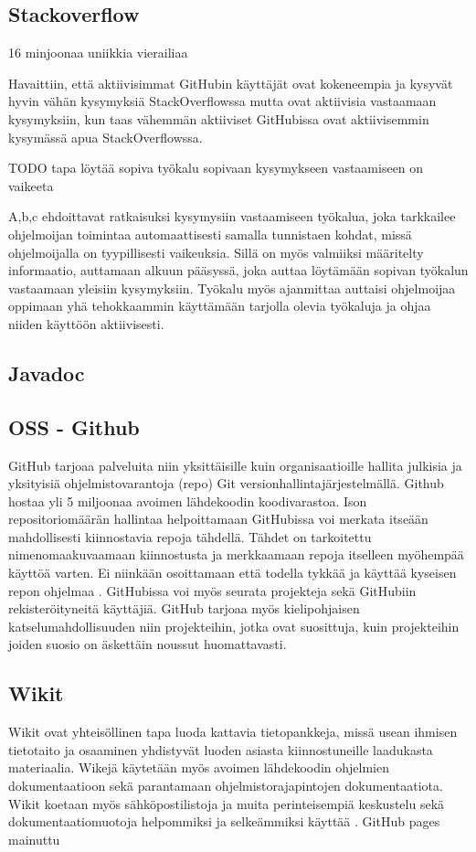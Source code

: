 \documentclass[finnish]{../tktltiki2}
\theoremstyle{definition}
\theoremstyle{remark}
\begin{document}
\subsection{Stackoverflow}
16 minjoonaa uniikkia vierailiaa \cite{social-networking-meets-se}
\cite{social-networking-meets-se}

Havaittiin, että aktiivisimmat GitHubin käyttäjät ovat kokeneempia ja kysyvät hyvin vähän kysymyksiä StackOverflowssa mutta ovat aktiivisia vastaamaan kysymyksiin, kun taas vähemmän aktiiviset GitHubissa ovat aktiivisemmin kysymässä apua StackOverflowssa.  \cite{stackoverflow-and-github}

TODO tapa löytää sopiva työkalu sopivaan kysymykseen vastaamiseen on vaikeeta \cite{programmers-coach}

A,b,c ehdoittavat ratkaisuksi kysymysiin vastaamiseen työkalua, joka tarkkailee ohjelmoijan toimintaa automaattisesti samalla tunnistaen kohdat, missä ohjelmoijalla on tyypillisesti vaikeuksia. Sillä on myös valmiiksi määritelty informaatio, auttamaan alkuun pääsyssä, joka auttaa löytämään sopivan työkalun vastaamaan yleisiin kysymyksiin. Työkalu myös ajanmittaa auttaisi ohjelmoijaa oppimaan yhä tehokkaammin käyttämään tarjolla olevia työkaluja ja ohjaa niiden käyttöön aktiivisesti.
\cite{programmers-coach}
\subsection{Javadoc}
\subsection{OSS - Github}
GitHub tarjoaa palveluita niin yksittäisille kuin organisaatioille hallita julkisia ja yksityisiä ohjelmistovarantoja (repo) Git versionhallintajärjestelmällä. Github hostaa yli 5 miljoonaa avoimen lähdekoodin koodivarastoa. Ison repositoriomäärän hallintaa helpoittamaan GitHubissa voi merkata itseään mahdollisesti kiinnostavia repoja tähdellä. Tähdet on tarkoitettu nimenomaakuvaamaan kiinnostusta ja merkkaamaan repoja itselleen myöhempää käyttöä varten. Ei niinkään osoittamaan että todella tykkää ja käyttää kyseisen repon ohjelmaa \cite{social-networking-meets-se}.
GitHubissa voi myös seurata projekteja sekä GitHubiin rekisteröityneitä käyttäjiä.
GitHub tarjoaa myös kielipohjaisen katselumahdollisuuden niin projekteihin, jotka ovat suosittuja, kuin projekteihin joiden suosio on äskettäin noussut huomattavasti.
\cite{social-networking-meets-se}
\subsection{Wikit}
Wikit ovat yhteisöllinen tapa luoda kattavia tietopankkeja, missä usean ihmisen tietotaito ja osaaminen yhdistyvät luoden asiasta kiinnostuneille laadukasta materiaalia. Wikejä käytetään myös avoimen lähdekoodin ohjelmien dokumentaatioon sekä parantamaan ohjelmistorajapintojen dokumentaatiota. Wikit koetaan myös sähköpostilistoja ja muita perinteisempiä keskustelu sekä dokumentaatiomuotoja helpommiksi ja selkeämmiksi käyttää \cite{using-wikis-in-sw}.
GitHub pages mainuttu
\end{document}
